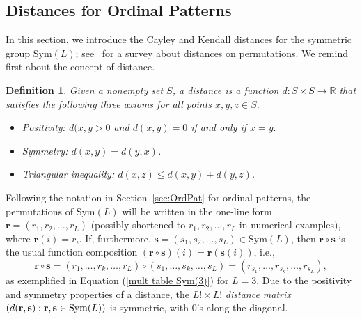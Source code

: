 \documentclass{article}
\newtheorem{definition}[theorem]{Definition}
\begin{document}

\subsection{Distances for Ordinal Patterns}

\label{sec:EditDist}

In this section, we introduce the Cayley and Kendall distances for the
symmetric group $\mathrm{Sym}(L)$; see~\cite{Deza1998} for a survey about
distances on permutations. We remind first about the concept of distance.

\begin{definition}
\label{DefDistance}Given a nonempty set $S$, a distance is a function $%
d:S\times S\rightarrow \mathbb{R}$ that satisfies the following three axioms
for all points $x,y,z\in S$.

\begin{itemize}
\item[\textbf{\emph{(D1)}}] \emph{Positivity:} $d(x,y>0$ and $d(x,y)=0$ if and only if $x=y.$

\item[\textbf{\emph{(D2)}}] \emph{Symmetry:} $d(x,y)=d(y,x)$.

\item[\textbf{\emph{(D3)}}] \emph{Triangular inequality: }$d(x,z)\leq d(x,y)+d(y,z)$.
\end{itemize}
\end{definition}

Following the notation in Section~\ref{sec:OrdPat} for ordinal patterns, the
permutations of $\mathrm{Sym}(L)$ will be written in the one-line form $%
\mathbf{r}=(r_{1},r_{2},\ldots,r_{L})$ (possibly shortened to $%
r_{1},r_{2},\ldots,r_{L}$ in numerical examples), where $\mathbf{r}(i)=r_{i}$. If,
furthermore, $\mathbf{s}=(s_{1},s_{2},\ldots,s_{L})\in \mathrm{Sym}(L)$, then $%
\mathbf{r}\circ \mathbf{s}$ is the usual function composition $(\mathbf{r}%
\circ \mathbf{s})(i)=\mathbf{r}(\mathbf{s}(i))$, i.e.,%
\begin{equation}
\mathbf{r}\circ \mathbf{s}=(r_{1},\ldots,r_{k},\ldots,r_{L})\circ
(s_{1},\ldots,s_{k},\ldots,s_{L})=(r_{s_{1}},\ldots,r_{s_{k}},\ldots,r_{s_{L}}),
\label{r rosquilla s}
\end{equation}%
as exemplified in Equation (\ref{mult table Sym(3)}) for $L=3$. Due to the
positivity and symmetry properties of a distance, the $L!\times L!$ \textit{%
distance matrix} $(d(\mathbf{r},\mathbf{s}):\mathbf{r},\mathbf{s}\in \mathrm{%
Sym}(L))$ is symmetric, with $0$'s along the diagonal.
\end{document}
